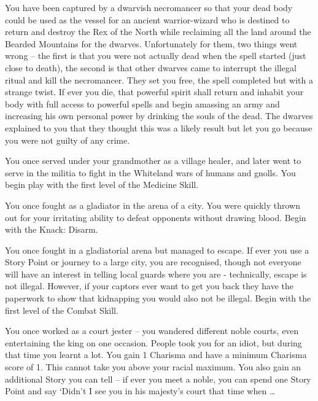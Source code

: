 \begin{multicols}{2}
\begin{list}{\addtocounter{list}{1}\textbf{:}}{\raggedleft}
\item{ You have been captured by a dwarvish necromancer so that your dead body could be used as the vessel for an ancient warrior-wizard who is destined to return and destroy the Rex of the North while reclaiming all the land around the Bearded Mountains for the dwarves.  Unfortunately for them, two things went wrong -- the first is that you were not actually dead when the spell started (just close to death), the second is that other dwarves came to interrupt the illegal ritual and kill the necromancer.  They set you free, the spell completed but with a strange twist.  If ever you die, that powerful spirit shall return and inhabit your body with full access to powerful spells and begin amassing an army and increasing his own personal power by drinking the souls of the dead.  The dwarves explained to you that they thought this was a likely result but let you go because you were not guilty of any crime. }

\item{ You once served under your grandmother as a village healer, and later went to serve in the militia to fight in the Whiteland wars of humans and gnolls.  You begin play with the first level of the Medicine Skill. }

\item{ You once fought as a gladiator in the arena of a city.  You were quickly thrown out for your irritating ability to defeat opponents without drawing blood.  Begin with the Knack: Disarm. }

\item{ You once fought in a gladiatorial arena but managed to escape.  If ever you use a Story Point or journey to a large city, you are recognised, though not everyone will have an interest in telling local guards where you are - technically, escape is not illegal.  However, if your captors ever want to get you back they have the paperwork to show that kidnapping you would also not be illegal.  Begin with the first level of the Combat Skill. }

\item{ You once worked as a court jester -- you wandered different noble courts, even entertaining the king on one occasion.  People took you for an idiot, but during that time you learnt a lot.  You gain 1 Charisma and have a minimum Charisma score of 1.  This cannot take you above your racial maximum.  You also gain an additional Story you can tell -- if ever you meet a noble, you can spend one Story Point and say `Didn't I see you in his majesty's court that time when \ldots}


\end{list}
\end{multicols}
